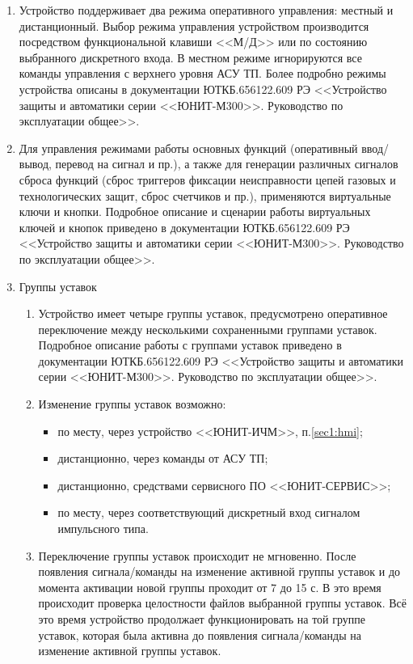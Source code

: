 \begin{enumerate}
\item
Устройство поддерживает два режима оперативного управления: местный и дистанционный. Выбор режима управления устройством производится посредством функциональной клавиши <<М/Д>> или по состоянию выбранного дискретного входа. В местном режиме игнорируются все команды управления с верхнего уровня АСУ ТП. Более подробно режимы устройства описаны в документации ЮТКБ.656122.609 РЭ <<Устройство защиты и автоматики серии <<ЮНИТ-М300>>. Руководство по эксплуатации общее>>.
\item
Для управления режимами работы основных функций (оперативный ввод/вывод, перевод на сигнал и пр.), а также для генерации различных сигналов сброса функций (сброс триггеров фиксации неисправности цепей газовых и технологических защит, сброс счетчиков и пр.), применяются виртуальные ключи и кнопки. Подробное описание и сценарии работы виртуальных ключей и кнопок приведено в документации ЮТКБ.656122.609 РЭ <<Устройство защиты и автоматики серии <<ЮНИТ-М300>>. Руководство по эксплуатации общее>>. 

\item Группы уставок
\begin{enumerate}

\item Устройство имеет четыре группы уставок, предусмотрено оперативное переключение между несколькими сохраненными группами уставок. Подробное описание работы с группами уставок приведено в документации ЮТКБ.656122.609 РЭ <<Устройство защиты и автоматики серии <<ЮНИТ-М300>>. Руководство по эксплуатации общее>>.

\item
Изменение группы уставок возможно:
\begin{itemize}
    \item по месту, через устройство <<ЮНИТ-ИЧМ>>, п.\ref{sec1:hmi};
    \item дистанционно, через команды от АСУ ТП;
    \item дистанционно, средствами сервисного ПО <<ЮНИТ-СЕРВИС>>;
    \item по месту, через соответствующий дискретный вход сигналом импульсного типа.
\end{itemize}
\item
Переключение группы уставок происходит не мгновенно. После появления сигнала/команды на изменение активной группы уставок и до момента активации новой группы проходит от 7 до 15 с. В это
время происходит проверка целостности файлов выбранной группы уставок. Всё это время устройство продолжает функционировать на той группе уставок, которая была активна до появления сигнала/команды на изменение активной группы уставок.


\end{enumerate}
\end{enumerate}
